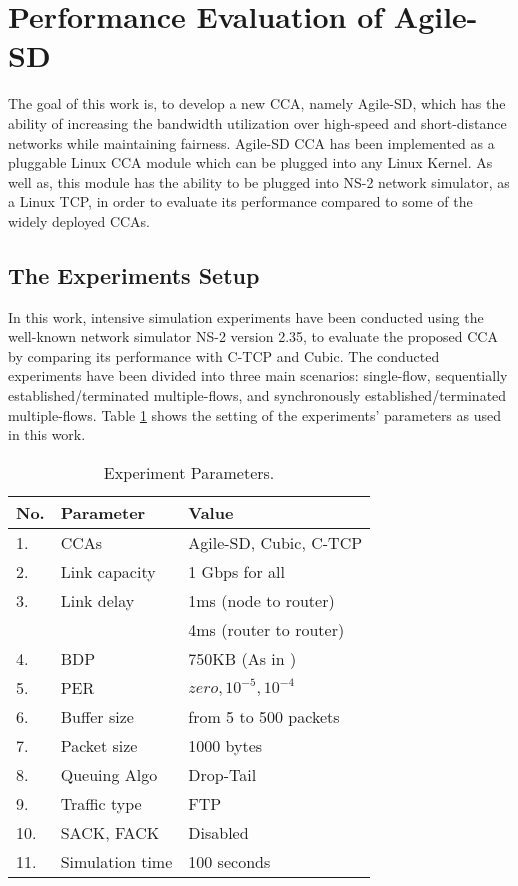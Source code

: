 \documentclass[preprint,3p,times,twocolumn,authoryear]{elsarticle}
\begin{document}
\section{Performance Evaluation of Agile-SD}
\label{PE}
The goal of this work is, to develop a new CCA, namely Agile-SD, which has the ability of increasing the bandwidth utilization over high-speed and short-distance networks while maintaining fairness. \mbox{Agile-SD} CCA has been implemented as a pluggable Linux CCA module which can be plugged into any Linux Kernel. As well as, this module has the ability to be plugged into NS-2 network simulator, as a Linux TCP, in order to evaluate its performance compared to some of the widely deployed CCAs.

\subsection{The Experiments Setup}
In this work, intensive simulation experiments have been conducted using the well-known network simulator NS-2 version 2.35, to evaluate the proposed CCA by comparing its performance with C-TCP and \mbox{Cubic}. The conducted experiments have been divided into three main scenarios: single-flow, sequentially established/terminated multiple-flows, and synchronously established/terminated multiple-flows. Table \ref{params} shows the setting of the experiments' parameters as used in this work.
\begin{table}[h!]
	\caption{Experiment Parameters.}
	\begin{center}
	\begin{tabular}{p{0.15cm}p{2.24cm}p{4.16cm}} \hline
	No.& Parameter			&	Value									\\ \hline
	1. & CCAs				&	Agile-SD, Cubic, C-TCP					\\ 2. & Link capacity		&	1 Gbps for all							\\ 3. & Link delay			&	1ms (node to router)						\\ & 					&	4ms (router to router)					\\ 4. & BDP				&	750KB (As in \citep{RFC1072})			\\ 5. & PER				&   $zero, 10^{-5}, 10^{-4}$				\\6. & Buffer size		&	from 5 to 500 packets					\\ 7. & Packet size		&	1000 bytes								\\ 8. & Queuing Algo	 	&	Drop-Tail								\\ 9. & Traffic type		&	FTP										\\ 10. & SACK, FACK		&	Disabled								\\ 11. & Simulation time	&	100 seconds								\\ \hline
	\end{tabular}
	\label{params}
	\end{center}
\end{table}
\end{document}
